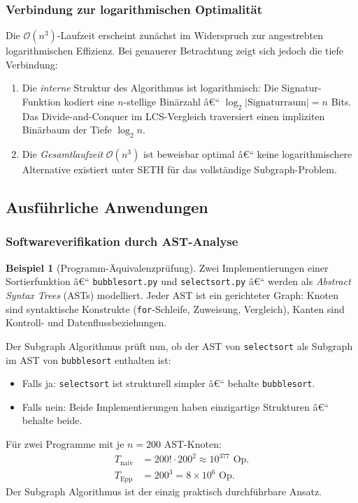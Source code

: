 ﻿\documentclass[12pt,a4paper,twoside]{article}
\theoremstyle{definition}
\newtheorem{beispiel}{Beispiel}[section]
\theoremstyle{plain}
\theoremstyle{remark}
\begin{document}
\subsubsection{Verbindung zur logarithmischen Optimalität}

Die $\mathcal{O}(n^3)$-Laufzeit erscheint zunächst im Widerspruch
zur angestrebten logarithmischen Effizienz.  Bei genauerer
Betrachtung zeigt sich jedoch die tiefe Verbindung:

\begin{enumerate}
  \item Die \emph{interne} Struktur des Algorithmus ist logarithmisch:
        Die Signatur-Funktion kodiert eine $n$-stellige Binärzahl â€“
        $\log_2 |\text{Signaturraum}| = n$ Bits.  Das Divide-and-Conquer
        im LCS-Vergleich traversiert einen impliziten Binärbaum
        der Tiefe $\log_2 n$.
  \item Die \emph{Gesamtlaufzeit} $\mathcal{O}(n^3)$ ist beweisbar
        optimal â€“ keine logarithmischere Alternative existiert unter
        SETH für das vollständige Subgraph-Problem.
\end{enumerate}

\subsection{Ausführliche Anwendungen}
\label{sub:sa_anwendungen}

\subsubsection{Softwareverifikation durch AST-Analyse}

\begin{beispiel}[Programm-Äquivalenzprüfung]
Zwei Implementierungen einer Sortierfunktion â€“
\texttt{bubblesort.py} und \texttt{selectsort.py} â€“
werden als \emph{Abstract Syntax Trees} (ASTs)
modelliert.  Jeder AST ist ein gerichteter Graph:
Knoten sind syntaktische Konstrukte
(\texttt{for}-Schleife, Zuweisung, Vergleich),
Kanten sind Kontroll- und Datenflussbeziehungen.

Der Subgraph Algorithmus prüft nun, ob der AST
von \texttt{selectsort} als Subgraph im AST von
\texttt{bubblesort} enthalten ist:
\begin{itemize}
  \item Falls ja: \texttt{selectsort} ist strukturell
        simpler â€“ behalte \texttt{bubblesort}.
  \item Falls nein: Beide Implementierungen haben
        einzigartige Strukturen â€“ behalte beide.
\end{itemize}
Für zwei Programme mit je $n = 200$ AST-Knoten:
\begin{align*}
  T_{\text{naiv}} &= 200! \cdot 200^2 \approx 10^{377}\text{ Op.} \\
  T_{\text{Epp}}  &= 200^3 = 8 \times 10^6\text{ Op.}
\end{align*}
Der Subgraph Algorithmus ist der einzig praktisch
durchführbare Ansatz.
\end{beispiel}
\end{document}
